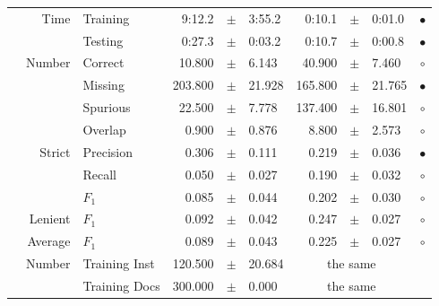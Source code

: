 \begin{longtable}{|r|r|l||rcl|rcl|c|}
\cline{2-10} & \multirow{2}{*}{      Time} &        Training &      9:12.2 &  $\pm$  &      3:55.2 &      0:10.1 &  $\pm$  &      0:01.0 & $\bullet$ \\
\cline{3-10} &                             &         Testing &      0:27.3 &  $\pm$  &      0:03.2 &      0:10.7 &  $\pm$  &      0:00.8 & $\bullet$ \\
\hline
\pagebreak
\hline
\hline
\multirow{11}{*}{\begin{sideways}sellerabr\end{sideways} }
             & \multirow{4}{*}{    Number} &         Correct &      10.800 &  $\pm$  &       6.143 &      40.900 &  $\pm$  &       7.460 & $\circ$ \\
\cline{3-10} &                             &         Missing &     203.800 &  $\pm$  &      21.928 &     165.800 &  $\pm$  &      21.765 & $\bullet$ \\
\cline{3-10} &                             &        Spurious &      22.500 &  $\pm$  &       7.778 &     137.400 &  $\pm$  &      16.801 & $\circ$ \\
\cline{3-10} &                             &         Overlap &       0.900 &  $\pm$  &       0.876 &       8.800 &  $\pm$  &       2.573 & $\circ$ \\
\cline{2-10} & \multirow{3}{*}{    Strict} &       Precision &       0.306 &  $\pm$  &       0.111 &       0.219 &  $\pm$  &       0.036 & $\bullet$ \\
\cline{3-10} &                             &          Recall &       0.050 &  $\pm$  &       0.027 &       0.190 &  $\pm$  &       0.032 & $\circ$ \\
\cline{3-10} &                             &           $F_1$ &       0.085 &  $\pm$  &       0.044 &       0.202 &  $\pm$  &       0.030 & $\circ$ \\
\cline{2-10} &                     Lenient &           $F_1$ &       0.092 &  $\pm$  &       0.042 &       0.247 &  $\pm$  &       0.027 & $\circ$ \\
\cline{2-10} &                     Average &           $F_1$ &       0.089 &  $\pm$  &       0.043 &       0.225 &  $\pm$  &       0.027 & $\circ$ \\
\cline{2-10} & \multirow{2}{*}{    Number} &   Training Inst &     120.500 &  $\pm$  &      20.684 &    \multicolumn{3}{c|}{the same}         &  \\
\cline{3-10} &                             &   Training Docs &     300.000 &  $\pm$  &       0.000 &    \multicolumn{3}{c|}{the same}         &  \\

\end{longtable}
